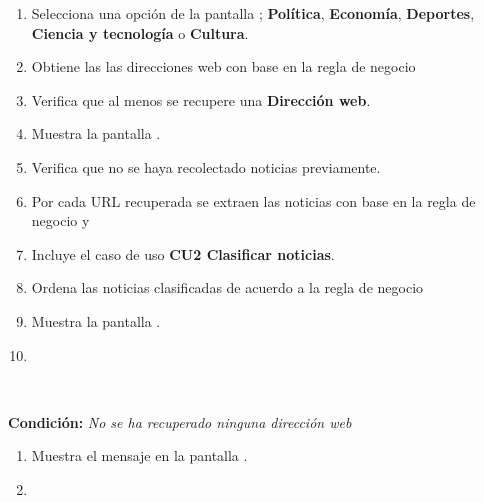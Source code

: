 \begin{enumerate}[1.]

	
	\item \actor Selecciona una opción de la pantalla ; \textbf{Política}, \textbf{Economía}, \textbf{Deportes}, \textbf{Ciencia y tecnología} o \textbf{Cultura}. 
	
	\item \sistema Obtiene las las direcciones web con base en la regla de negocio 
	
	\item \sistema Verifica que al menos se recupere una \textbf{Dirección web}. 

	\item \sistema Muestra la pantalla . 	

	\item \sistema Verifica que no se haya recolectado noticias previamente. 

	\item \sistema Por cada URL recuperada se extraen las noticias con base en la regla de negocio  y  

	\item \label{CU1:BuscarN}\sistema Incluye el caso de uso \textbf{CU2 Clasificar noticias}.

	\item \sistema Ordena las noticias clasificadas de acuerdo a la regla de negocio 

	\item \sistema \label{CU1:NoticiasR} Muestra la pantalla .

	\item \finCU	

\end{enumerate}



\begin{large}
	\\
\end{large}	
\textbf{Condición:} \textit{No se ha recuperado ninguna dirección web }

\begin{enumerate}[{A-}1.]

	\item \sistema Muestra el mensaje  en la pantalla .

	\item \finCU

\end{enumerate}


